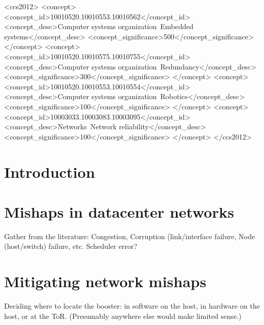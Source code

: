 \documentclass[sigconf]{acmart}
\begin{document}
%
%
\begin{CCSXML}
<ccs2012>
 <concept>
  <concept_id>10010520.10010553.10010562</concept_id>
  <concept_desc>Computer systems organization~Embedded systems</concept_desc>
  <concept_significance>500</concept_significance>
 </concept>
 <concept>
  <concept_id>10010520.10010575.10010755</concept_id>
  <concept_desc>Computer systems organization~Redundancy</concept_desc>
  <concept_significance>300</concept_significance>
 </concept>
 <concept>
  <concept_id>10010520.10010553.10010554</concept_id>
  <concept_desc>Computer systems organization~Robotics</concept_desc>
  <concept_significance>100</concept_significance>
 </concept>
 <concept>
  <concept_id>10003033.10003083.10003095</concept_id>
  <concept_desc>Networks~Network reliability</concept_desc>
  <concept_significance>100</concept_significance>
 </concept>
</ccs2012>  
\end{CCSXML}





\maketitle

\section{Introduction}

\section{Mishaps in datacenter networks}
Gather from the literature:
Congestion,
Corruption (link/interface failure,
Node (host/switch) failure, etc.
Scheduler error?

\section{Mitigating network mishaps}
Deciding where to locate the booster:
in software on the host,
in hardware on the host,
or at the ToR.
(Presumably anywhere else would make limited sense.)
\end{document}
